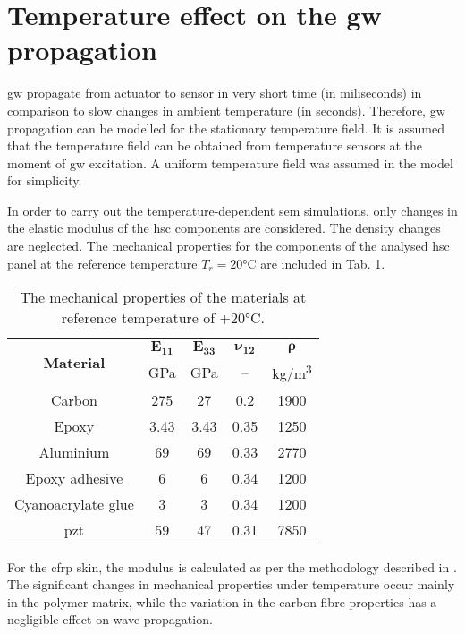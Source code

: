 \section{Temperature effect on the \acs{gw} propagation}
\label{sec:temp}
 
\ac{gw} propagate from actuator to sensor in very short time (in miliseconds) in comparison to slow changes in ambient temperature (in seconds).
Therefore, \ac{gw} propagation can be modelled for the stationary temperature field.
It is assumed that the temperature field can be obtained from temperature sensors at the moment of \ac{gw} excitation.
A uniform temperature field was assumed in the model for simplicity.

In order to carry out the temperature-dependent \ac{sem} simulations, only changes in the elastic modulus of the \ac{hsc} components are considered.
The density changes are neglected.
The mechanical properties for the components of the analysed \ac{hsc} panel at the reference temperature \(T_r=20\)\unit{\degreeCelsius} are included in Tab. \ref{tab:properties}.
\begin{table}[H]
	\small
	\tabcolsep=0.5cm
	\centering
	\caption{\label{tab:properties}The mechanical properties of the materials at reference temperature of +20\unit{\degreeCelsius}.}
	\begin{tabular}{ccccc}\toprule
		\multirow{2}{*}{\textbf{Material}} & $\boldsymbol{E_{11}}$ & $\boldsymbol{E_{33}}$ & $\boldsymbol{\nu_{12}}$ & $\boldsymbol{\rho}$ \\ & \unit{\giga\pascal} & \unit{\giga\pascal} & -- & \unit[per-mode = symbol]{\kilogram\per\cubic\meter}\\
		\midrule
		Carbon & 275 & 27 & 0.2 & 1900\\
		Epoxy & 3.43 & 3.43 & 0.35 & 1250\\
		Aluminium & 69 & 69 & 0.33 & 2770\\
		Epoxy adhesive & 6 & 6 & 0.34 & 1200\\
		Cyanoacrylate glue & 3 & 3 & 0.34 & 1200\\	
		\ac{pzt} &  59 & 47 & 0.31 & 7850\\
		\bottomrule
	\end{tabular}
\end{table}
For the \ac{cfrp} skin, the modulus is calculated as per the methodology described in \cite{chamis1983simplified,salamone2009guided}.
The significant changes in mechanical properties under temperature occur mainly in the polymer matrix, while the variation in the carbon fibre properties has a negligible effect on wave propagation.
